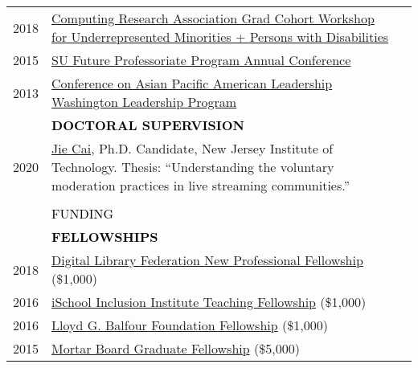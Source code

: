 \documentclass[11pt]{article}
\begin{document}
{{\begin{longtable}{Rp{0.75in}p{5.0in}}
\footnotesize{2018} & \href{https://cra.org/events/urmgradcohort/}{Computing Research Association Grad Cohort Workshop for Underrepresented Minorities + Persons with Disabilities}\\

\footnotesize{2015} & \href{http://graduateschool.syr.edu/programs/future-professoriate-program/}{SU Future Professoriate Program Annual Conference}\\

\footnotesize{2013} & \href{https://www.capal.org/programs/wlp/}{Conference on Asian Pacific American Leadership Washington Leadership Program}\\

& \textcolor{black}{\uppercase{\textbf{Doctoral  Supervision}}}\\

\footnotesize{2020} & \href{https://jc926.github.io/Jie_Cai/}{Jie Cai}, Ph.D. Candidate, New Jersey Institute of Technology. \newline
Thesis: ``Understanding the voluntary moderation practices in live streaming communities.''\\

\\

\sout{\hfill} & \par \Large \textcolor{black}{\uppercase{Funding\hspace{6pt} \sout{\hfill}}}\\

& \textcolor{black}{\uppercase{\textbf{Fellowships}}}\\

\footnotesize{2018} & \href{https://forum2018.diglib.org/fellowship-opportunities/fellows/}{Digital Library Federation New Professional Fellowship} (\$1,000)\\

\footnotesize{2016} & \href{http://www.sis.pitt.edu/i3/phd-fellows/fellow-profiles.html}{iSchool Inclusion Institute Teaching Fellowship} (\$1,000)\\

\footnotesize{2016} & \href{https://www.bankofamerica.com/philanthropic/foundation.go?fnId=31}{Lloyd G. Balfour Foundation Fellowship} (\$1,000)\\

\footnotesize{2015} & \href{https://news.syr.edu/2015/07/ischool-student-awarded-5000-mortar-board-fellowship-22021/}{Mortar Board Graduate Fellowship} (\$5,000)\\


\end{longtable}}}
\end{document}
